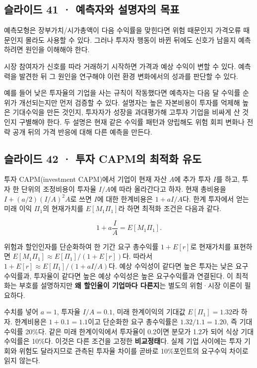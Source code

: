 \documentclass[11pt,a4paper]{article}
\begin{document}
\subsection{슬라이드 41 · 예측자와 설명자의 목표}
예측모형은 장부가치/시가총액이 다음 수익률을 맞힌다면 위험 때문인지 가격오류 때문인지 몰라도 사용할 수 있다. 그러나 투자자 행동이 바뀐 뒤에도 신호가 남을지 예측하려면 원인을 이해해야 한다.\par

시장 참여자가 신호를 따라 거래하기 시작하면 가격과 예상 수익이 변할 수 있다. 예측력을 발견한 뒤 그 원인을 연구해야 이런 환경 변화에서의 성과를 판단할 수 있다.\par

예를 들어 낮은 투자율의 기업을 사는 규칙이 작동했다면 예측자는 다음 달 수익률 순위가 개선되는지만 먼저 검증할 수 있다. 설명자는 높은 자본비용이 투자를 억제해 높은 기대수익을 만든 것인지, 투자자가 성장을 과대평가해 고투자 기업을 비싸게 산 것인지 구별해야 한다. 두 설명은 현재 같은 수익률 패턴과 양립해도 위험 회피 변화나 전략 공개 뒤의 가격 반응에 대해 다른 예측을 만든다.\par

\subsection{슬라이드 42 · 투자 CAPM의 최적화 유도}
투자 CAPM(investment CAPM)에서 기업이 현재 자산 $A$에 추가 투자 $I$를 하고, 투자 한 단위의 조정비용이 투자율 $I/A$에 따라 올라간다고 하자. 현재 총비용을 $I+(a/2)(I/A)^2A$로 쓰면 $I$에 대한 한계비용은 $1+aI/A$다. 한계 투자에서 얻는 미래 이익 $\Pi_1$의 현재가치를 $E[M_1\Pi_1]$라 하면 최적화 조건은 다음과 같다.\par

\[
1+a\frac{I}{A}=E[M_1\Pi_1].
\]

위험과 할인인자를 단순화하여 한 기간 요구 총수익률 $1+E[r]$로 현재가치를 표현하면 $E[M_1\Pi_1]\approx E[\Pi_1]/(1+E[r])$다. 따라서 $1+E[r]\approx E[\Pi_1]/(1+aI/A)$다. 예상 수익성이 같다면 높은 투자는 낮은 요구수익률과, 투자율이 같다면 높은 예상 수익성은 높은 요구수익률과 연결된다. 이 최적화는 부호를 설명하지만 \textbf{왜 할인율이 기업마다 다른지}는 별도의 위험·시장 이론이 필요하다.\par

수치를 넣어 $a=1$, 투자율 $I/A=0.1$, 미래 한계이익의 기대값 $E[\Pi_1]=1.32$라 하자. 한계비용은 $1+0.1=1.1$이고 단순화한 요구 총수익률은 $1.32/1.1=1.20$, 즉 기대수익률 20\%다. 같은 미래 한계이익에서 투자율이 0.2이면 분모가 1.2가 되어 식상 기대수익률은 10\%다. 이것은 다른 조건을 고정한 \textbf{비교정태}다. 실제 기업 사이에는 투자 기회와 위험도 달라지므로 관측된 투자율 차이를 곧바로 10\%포인트의 요구수익 차이로 읽지 않는다.\par
\end{document}
